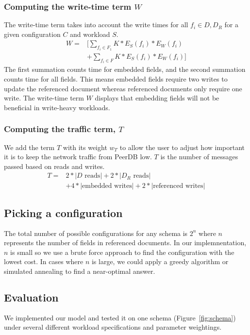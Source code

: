 \subsubsection{Computing the write-time term $W$}
The write-time term takes into account the write times for all $f_i \in D, D_R$ for a given configuration $C$ and workload $S$. 
\begin{align*}
W =& [\sum_{f_i \in F_1} K*E_S(f_i)*E_W(f_i)\\
& + \sum_{f_i \in F} K*E_S(f_i)*E_W(f_i)]
\end{align*}
The first summation counts time for embedded fields, and the second summation counts time for all fields. This means embedded fields require two writes to update the referenced document whereas referenced documents only require one write. 
The write-time term $W$ displays that embedding fields will not be beneficial in write-heavy workloads.

\subsubsection{Computing the traffic term, $T$}
We add the term $T$ with its weight $w_T$ to allow the user to adjust how important it is to keep the network traffic from PeerDB low. 
$T$ is the number of messages passed based on reads and writes. 
\begin{align*}
T=& 2*|D\text{ reads}| + 2*|D_R\text{ reads}|\\
& + 4*|\text{embedded writes}| + 2*|\text{referenced writes}| 
\end{align*}

\subsection{Picking a configuration}
The total number of possible configurations for any schema is $2^n$ where $n$ represents the number of fields in referenced documents. 
In our implemnentation, $n$ is small so we use a brute force approach to find the configuration with the lowest cost. 
In cases where $n$ is large, we could apply a greedy algorithm or simulated annealing to find a near-optimal answer.

\subsection{Evaluation}
We implemented our model and tested it on one schema (Figure~\ref{fig:schema}) under several different workload specifications and parameter weightings. 

